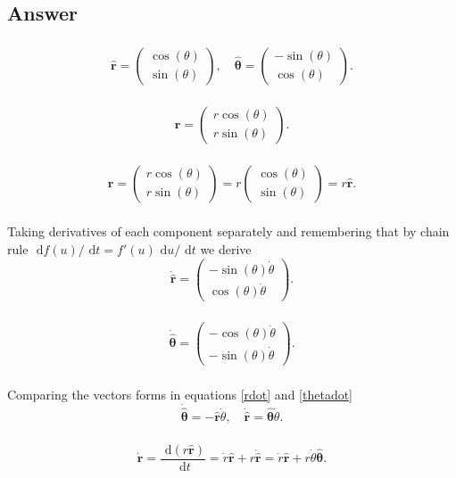 \documentclass[]{article}
\newcommand{\myvec}[1]{\ensuremath{\begin{pmatrix}#1\end{pmatrix}}}
\newcommand{\bb}{\begin{equation}}
\newcommand{\ee}{\end{equation}}
\newcommand{\rd}{\text{ d}}
\newcommand{\eqns}[2]{equations \eqref{#1} and \eqref{#2}}
\renewcommand{\l}{\left(}
\renewcommand{\r}{\right)}
\begin{document}
\begin{Answ}
\subsection{Answer}
\subsubsection{}
\bb
\hat{\bm{r}}=\myvec{\cos(\theta)\\ \sin(\theta)}, \quad \hat{\bm{\theta}}=\myvec{-\sin(\theta)\\ \cos(\theta)}.
\ee
\subsubsection{}
\bb
\bm{r}=\myvec{r\cos(\theta)\\r\sin(\theta)}.
\ee
\subsubsection{}
\bb
\bm{r}=\myvec{r\cos(\theta)\\r\sin(\theta)}=r\myvec{\cos(\theta)\\\sin(\theta)}=r\hat{\bm{r}}.
\ee
\subsubsection{}
Taking derivatives of each component separately and remembering that by chain rule $\rd f(u)/\rd t=f'(u)\rd u/\rd t$ we derive
\bb
\dot{\hat{\bm{r}}}=\myvec{-\sin(\theta)\dot{\theta}\\\cos(\theta)\dot{\theta}}.\label{rdot}
\ee
\subsubsection{}
\bb
\dot{\hat{\bm{\theta}}}=\myvec{-\cos(\theta)\dot{\theta}\\-\sin(\theta)\dot{\theta}}.\label{thetadot}
\ee
\subsubsection{}
Comparing the vectors forms in \eqns{rdot}{thetadot}
\bb
\dot{\hat{\bm{\theta}}}=-\hat{\bm{r}}\dot{\theta},\quad
\dot{\hat{\bm{r}}}=\hat{\bm{\theta}}\dot{\theta}.
\ee
\subsubsection{}
\bb
\dot{\bm{r}}=\frac{\rd \l r\hat{\bm{r}} \r}{\rd t}=\dot{r}\hat{\bm{r}}+r\dot{\hat{\bm{r}}}=\dot{r}\hat{\bm{r}}+r\dot{\theta}\hat{\bm{\theta}}.
\ee

\end{Answ}
\end{document}
